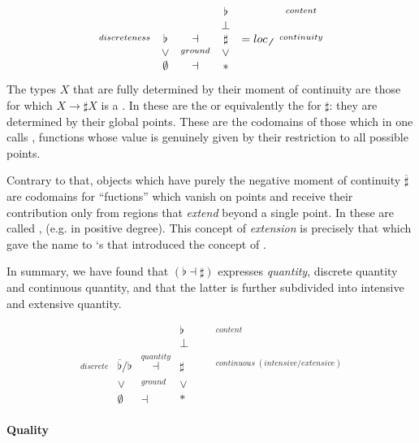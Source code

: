 \documentclass[12pt,titlepage]{article}
\newcommand{\itexarray}[1]{\begin{matrix}#1\end{matrix}}
\theoremstyle{plain}
\theoremstyle{definition}
\theoremstyle{remark}
\begin{document}
\begin{displaymath}
\itexarray{
     & && \flat && \stackrel{content}{}
     \\
     & && \bot &
     \\
     \stackrel{discreteness}{} & \flat &\dashv& \sharp & = loc_{\not \not}&  \stackrel{continuity}{}
     \\
     & \vee &\stackrel{ground}{}& \vee
     \\
     & \emptyset &\dashv& \ast &
  }
\end{displaymath}
The types $X$ that are fully determined by their moment of continuity are those for which $X \to \sharp X$ is a . In  these are the  or equivalently the  for $\sharp$: they are determined by their global points. These are the codomains of those  which in  one calls \emph{}, functions whose value is genuinely given by their restriction to all possible points.

Contrary to that, objects which have purely the negative moment of continuity $\overline{\sharp}$ are codomains for ``fuctions'' which vanish on points and receive their contribution only from regions that \emph{extend} beyond a single point. In  these are called \emph{}, (e.g.  in positive degree). This concept of \emph{extension} is precisely that which gave the name to `s \emph{} that introduced the concept of  .

In summary, we have found that $(\flat \dashv \sharp)$ expresses \emph{quantity}, discrete quantity and continuous quantity, and that the latter is further subdivided into intensive and extensive quantity.

\begin{displaymath}
\itexarray{
     & && \flat & && \stackrel{content}{}
     \\
     & && \bot & &&
     \\
     \stackrel{discrete}{} & \overline{\flat}/\flat &\stackrel{quantity}{\dashv}& \sharp &  &   & \stackrel{continuous\; (intensive/extensive)}{}
     \\
     & \vee &\stackrel{ground}{}& \vee
     \\
     & \emptyset &\dashv& \ast &
  }
\end{displaymath}
\hypertarget{quality}{}\paragraph*{{Quality}}\label{quality}
\end{document}
